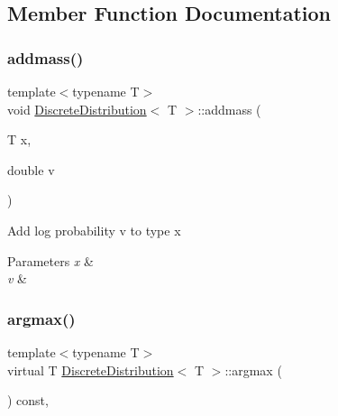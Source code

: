 \subsection{Member Function Documentation}
\mbox{\label{class_discrete_distribution_a6c41c7f4726019bc213d37d4e3cdea27}} 
\subsubsection{\texorpdfstring{addmass()}{addmass()}}
{\footnotesize\ttfamily template$<$typename T$>$ \\
void \hyperlink{class_discrete_distribution}{Discrete\+Distribution}$<$ T $>$\+::addmass (\begin{DoxyParamCaption}\item[{T}]{x,  }\item[{double}]{v }\end{DoxyParamCaption})\hspace{0.3cm}{\ttfamily [inline]}}

Add log probability v to type x 
\begin{DoxyParams}{Parameters}
{\em x} & \\
\hline
{\em v} & \\
\hline
\end{DoxyParams}
\mbox{\label{class_discrete_distribution_a7cf660223fe0f86b61e3b33268204c06}} 
\subsubsection{\texorpdfstring{argmax()}{argmax()}}
{\footnotesize\ttfamily template$<$typename T$>$ \\
virtual T \hyperlink{class_discrete_distribution}{Discrete\+Distribution}$<$ T $>$\+::argmax (\begin{DoxyParamCaption}{ }\end{DoxyParamCaption}) const\hspace{0.3cm}{\ttfamily [inline]}, {\ttfamily [virtual]}}

\mbox{\label{class_discrete_distribution_acb11f1cfbf4ef039c538f06cde8249fd}} 
